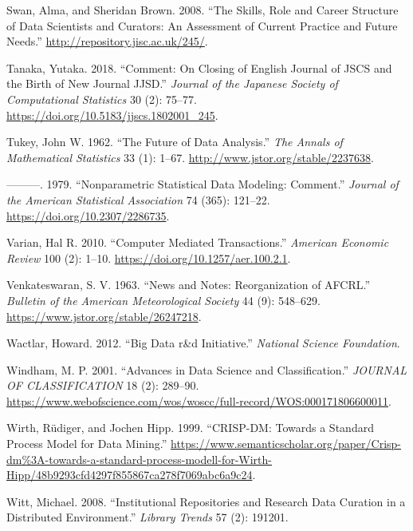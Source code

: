 \documentclass[
  letterpaper,
]{report}
\newlength{\cslhangindent}
\newlength{\cslentryspacingunit} %
\newenvironment{CSLReferences}[2] %
 {%
  \setlength{\parindent}{0pt}
  \ifodd #1
  \let\oldpar\par
  \def\par{\hangindent=\cslhangindent\oldpar}
  \fi
  \setlength{\parskip}{#2\cslentryspacingunit}
 }%
 {}
\begin{document}
\begin{CSLReferences}{1}{0}
\leavevmode{}%
Swan, Alma, and Sheridan Brown. 2008. {``The Skills, Role and Career
Structure of Data Scientists and Curators: An Assessment of Current
Practice and Future Needs.''} \url{http://repository.jisc.ac.uk/245/}.

\leavevmode{}%
Tanaka, Yutaka. 2018. {``Comment: On Closing of English Journal of JSCS
and the Birth of New Journal JJSD.''} \emph{Journal of the Japanese
Society of Computational Statistics} 30 (2): 75--77.
\url{https://doi.org/10.5183/jjscs.1802001_245}.

\leavevmode{}%
Tukey, John W. 1962. {``The Future of Data Analysis.''} \emph{The Annals
of Mathematical Statistics} 33 (1): 1--67.
\url{http://www.jstor.org/stable/2237638}.

\leavevmode{}%
---------. 1979. {``Nonparametric Statistical Data Modeling: Comment.''}
\emph{Journal of the American Statistical Association} 74 (365):
121--22. \url{https://doi.org/10.2307/2286735}.

\leavevmode{}%
Varian, Hal R. 2010. {``Computer Mediated Transactions.''}
\emph{American Economic Review} 100 (2): 1--10.
\url{https://doi.org/10.1257/aer.100.2.1}.

\leavevmode{}%
Venkateswaran, S. V. 1963. {``News and Notes: Reorganization of
AFCRL.''} \emph{Bulletin of the American Meteorological Society} 44 (9):
548--629. \url{https://www.jstor.org/stable/26247218}.

\leavevmode{}%
Wactlar, Howard. 2012. {``Big Data r\&d Initiative.''} \emph{National
Science Foundation}.

\leavevmode{}%
Windham, M. P. 2001. {``Advances in Data Science and Classification.''}
\emph{JOURNAL OF CLASSIFICATION} 18 (2): 289--90.
\url{https://www.webofscience.com/wos/woscc/full-record/WOS:000171806600011}.

\leavevmode{}%
Wirth, Rüdiger, and Jochen Hipp. 1999. {``CRISP-DM: Towards a Standard
Process Model for Data Mining.''}
\url{https://www.semanticscholar.org/paper/Crisp-dm\%3A-towards-a-standard-process-modell-for-Wirth-Hipp/48b9293cfd4297f855867ca278f7069abc6a9c24}.

\leavevmode{}%
Witt, Michael. 2008. {``Institutional Repositories and Research Data
Curation in a Distributed Environment.''} \emph{Library Trends} 57 (2):
191201.


\end{CSLReferences}
\end{document}
